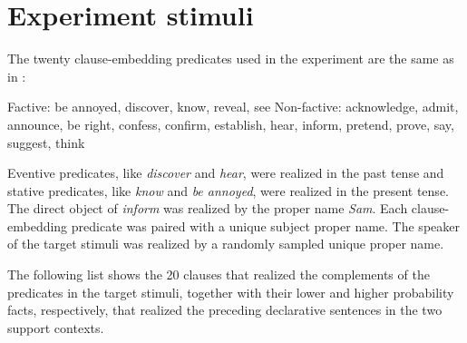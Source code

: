 \documentclass[11pt,fleqn]{article}
\newcommand{\6}{\mbox{$[\hspace*{-.6mm}[$}}
\newcommand{\9}{\mbox{$]\hspace*{-.6mm}]$}}
\begin{document}
\appendix

\setcounter{page}{1}

\setcounter{table}{0}
\renewcommand{\thetable}{A\arabic{table}}

\setcounter{figure}{0}
\renewcommand{\thefigure}{A\arabic{figure}}

\section{Experiment stimuli}\label{a:clauses}

The twenty clause-embedding predicates used in the experiment are the same as in \citealt{degen-tonhauser-openmind,degen-tonhauser-language}:

\begin{exe}
\ex\label{predicates}
\begin{xlist}
\ex Factive: be annoyed, discover, know, reveal, see
\ex Non-factive: acknowledge, admit, announce, be right, confess, confirm, establish, hear, inform, pretend, prove, say, suggest, think
\end{xlist}
\end{exe}
Eventive predicates, like {\em discover} and {\em hear}, were realized in the past tense and stative predicates, like {\em know} and {\em be annoyed}, were realized in the present tense. The direct object of {\em inform} was realized by the proper name {\em Sam}. Each clause-embedding predicate was paired with a unique subject proper name. The speaker of the target stimuli was realized by a randomly sampled unique proper name. 

The following list shows the 20 clauses that realized the complements of the predicates in the target stimuli, together with their lower and higher probability facts, respectively, that realized the preceding declarative sentences in the two support contexts.
\end{document}
